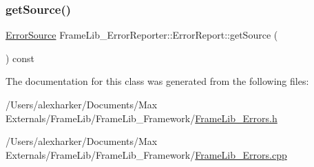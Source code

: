 \mbox{\label{class_frame_lib___error_reporter_1_1_error_report_a882c38b72acccf483ece5efc6790d98a}} 
\subsubsection{\texorpdfstring{get\+Source()}{getSource()}}
{\footnotesize\ttfamily \hyperlink{_frame_lib___errors_8h_acdeab3b10c3aca41a844aa51b90b6f39}{Error\+Source} Frame\+Lib\+\_\+\+Error\+Reporter\+::\+Error\+Report\+::get\+Source (\begin{DoxyParamCaption}{ }\end{DoxyParamCaption}) const\hspace{0.3cm}{\ttfamily [inline]}}



The documentation for this class was generated from the following files\+:\begin{DoxyCompactItemize}
\item 
/\+Users/alexharker/\+Documents/\+Max Externals/\+Frame\+Lib/\+Frame\+Lib\+\_\+\+Framework/\hyperlink{_frame_lib___errors_8h}{Frame\+Lib\+\_\+\+Errors.\+h}\item 
/\+Users/alexharker/\+Documents/\+Max Externals/\+Frame\+Lib/\+Frame\+Lib\+\_\+\+Framework/\hyperlink{_frame_lib___errors_8cpp}{Frame\+Lib\+\_\+\+Errors.\+cpp}\end{DoxyCompactItemize}
